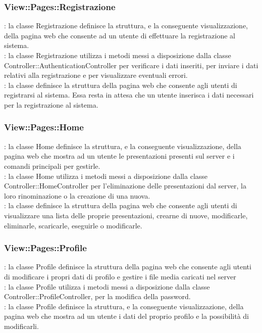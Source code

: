 {{		\subsubsection{View::\-Pages::\-Registrazione}{
			\textbf{\tipo}: la classe Registrazione definisce la struttura, e la conseguente visualizzazione, della pagina web che consente ad un utente di effettuare la registrazione al sistema.\\
			\textbf{\relaz}: la classe Registrazione utilizza i metodi messi a disposizione dalla classe Controller::\-AuthenticationController per verificare i dati inseriti, per inviare i dati relativi alla registrazione e per visualizzare eventuali errori.\\
			\textbf{\attivita}: la classe definisce la struttura della pagina web che consente agli utenti di registrarsi al sistema. Essa resta in attesa che un utente inserisca i dati necessari per la registrazione al sistema.
		}
		\subsubsection{View::\-Pages::\-Home}{
			\textbf{\tipo}: la classe Home definisce la struttura, e la conseguente visualizzazione, della pagina web che mostra ad un utente le presentazioni presenti sul server e i comandi principali per gestirle.\\	
			\textbf{\relaz}: la classe Home utilizza i metodi messi a disposizione dalla classe Controller::\-HomeController per l'eliminazione delle presentazioni dal server, la loro rinominazione o la creazione di una nuova.\\
			\textbf{\attivita}: la classe definisce la struttura della pagina web che consente agli utenti di visualizzare una lista delle proprie presentazioni, crearne di nuove, modificarle, eliminarle, scaricarle, eseguirle o modificarle.
		}
		\subsubsection{View::\-Pages::\-Profile}{
			\textbf{\tipo}: la classe Profile definisce la struttura della pagina web che consente agli utenti di modificare i propri dati di profilo e gestire i file media caricati nel server \\
			\textbf{\relaz}: la classe Profile utilizza i metodi messi a disposizione dalla classe Controller::\-ProfileController, per la modifica della password.\\
			\textbf{\attivita}: la classe Profile definisce la struttura, e la conseguente visualizzazione, della pagina web che mostra ad un utente i dati del proprio profilo e la possibilità di modificarli.
		}
}}
